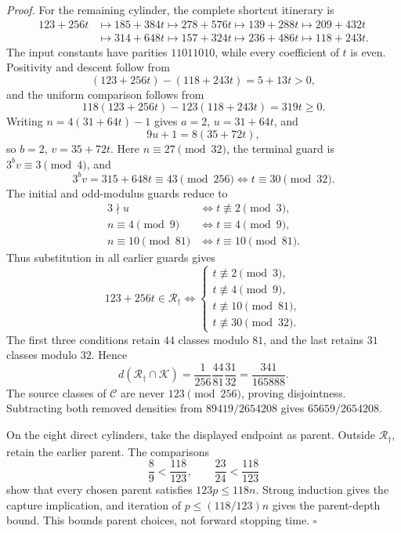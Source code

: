 \documentclass[11pt,letterpaper]{article}
\newenvironment{proof}{\noindent\textit{Proof.}}{\hfill\(\square\)}
\begin{document}
\begin{proof}
For the remaining cylinder, the complete shortcut itinerary is
\[
\begin{aligned}
123+256t&\longmapsto185+384t\longmapsto278+576t
 \longmapsto139+288t\longmapsto209+432t\\
&\longmapsto314+648t\longmapsto157+324t
 \longmapsto236+486t\longmapsto118+243t.
\end{aligned}
\]
The input constants have parities \(11011010\), while every coefficient of
\(t\) is even. Positivity and descent follow from
\[
(123+256t)-(118+243t)=5+13t>0,
\]
and the uniform comparison follows from
\[
118(123+256t)-123(118+243t)=319t\ge0.
\]
Writing \(n=4(31+64t)-1\) gives \(a=2\), \(u=31+64t\), and
\[
9u+1=8(35+72t),
\]
so \(b=2\), \(v=35+72t\). Here \(n\equiv27\pmod{32}\), the terminal
guard is \(3^bv\equiv3\pmod4\), and
\[
3^bv=315+648t\equiv43\pmod{256}
\iff t\equiv30\pmod{32}.
\]
The initial and odd-modulus guards reduce to
\[
\begin{aligned}
3\nmid u&\iff t\not\equiv2\pmod3,\\
n\equiv4\pmod9&\iff t\equiv4\pmod9,\\
n\equiv10\pmod{81}&\iff t\equiv10\pmod{81}.
\end{aligned}
\]
Thus substitution in all earlier guards gives
\[
123+256t\in\mathcal R_{\dagger}
\iff
\begin{cases}
t\not\equiv2\pmod3,\\
t\not\equiv4\pmod9,\\
t\not\equiv10\pmod{81},\\
t\not\equiv30\pmod{32}.
\end{cases}
\]
The first three conditions retain \(44\) classes modulo \(81\), and the
last retains \(31\) classes modulo \(32\). Hence
\[
d(\mathcal R_{\dagger}\cap\mathcal K)
 =\frac1{256}\frac{44}{81}\frac{31}{32}
 =\frac{341}{165888}.
\]
The source classes of \(\mathcal C\) are never \(123\pmod{256}\), proving
disjointness. Subtracting both removed densities from
\(89419/2654208\) gives \(65659/2654208\).

On the eight direct cylinders, take the displayed endpoint as parent. Outside
\(\mathcal R_{\dagger}\), retain the earlier parent. The comparisons
\[
\frac89<\frac{118}{123},\qquad
\frac{23}{24}<\frac{118}{123}
\]
show that every chosen parent satisfies \(123p\le118n\). Strong induction
gives the capture implication, and iteration of \(p\le(118/123)n\) gives
the parent-depth bound. This bounds parent choices, not forward stopping time.
\end{proof}
\end{document}
